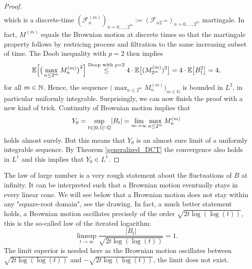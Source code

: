 \begin{proof}[Proof]
\begin{align*}
	\end{align*}
	which is a discrete-time $(\mathcal F^{(m)}_n)_{n=0,...,2^m}:=(\mathcal F_{n 2^{-m}})_{n=0,...,2^m}$ martingale. In fact, $M^{(m)}$ equals the Brownian motion at discrete times so that the martingale property follows by restricing process and filtration to the same increasing subset of time. The Doob inequality with $p=2$ then implies
	\begin{align*}
		\mathbb{E}\Big[ \big(\max_{n\leq 2^m} M_n^{(m)}\big)^2\Big] \overset{\text{Doop with }p=2}{\leq} 4 \cdot \mathbb{E}\big[ (M_{2^m}^{(m)})^2\big] = 4 \cdot \mathbb{E} \big[ B_1^2\big] = 4,
	\end{align*}
	for all $m\in \mathbb{N}$. Hence, the sequence $\big(\max_{n\leq 2^m} M_n^{(m)}\big)_{m\in\mathbb{N}}$ is bounded in $L^2$, in particular uniformly integrable. Surprisingly, we can now finish the proof with a new kind of trick. Continuity of Brownian motion implies that $$Y_0 = \sup_{t\in[0,1]\cap \mathbb{Q}}\lvert B_t \rvert  = \lim_{m\to\infty} \max_{n\leq 2^m} M_n^{(m)}$$ holds almost surely. But this means that $Y_0$ is an almost sure limit of a uniformly integrable sequence. By Theorem \ref{generalized_DCT} the convergence also holds in $L^1$ and this implies that $Y_0\in L^1$.
\end{proof}
The law of large number is a very rough statement about the fluctuations of $B$ at infinity. It can be interpreted such that a Brownian motion eventually stays in every linear cone. We will see below that a Brownian motion does not stay within any "{}square-root domain", see the drawing. In fact, a much better statement holds, a Brownian motion oscillates precisely of the order $\sqrt{2t \log (\log (t))}$, this is the so-called law of the iterated logarithm: $$\limsup_{t\to\infty}\frac{|B_t|}{\sqrt{2t \log( \log(t))}}=1.$$ The limit superior is needed here as the Brownian motion oscillates between $\sqrt{2t \log( \log(t))}$ and $-\sqrt{2t \log( \log(t))}$, the limit does not exist.

